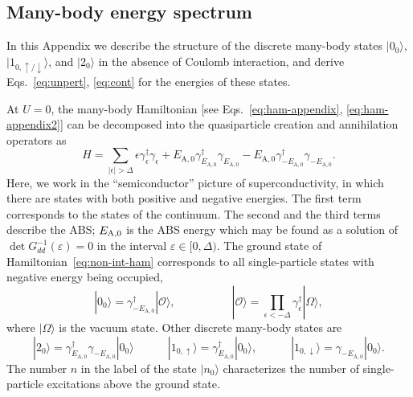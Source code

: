\documentclass[aps,reprint,longbibliography, prb]{revtex4-2}
\begin{document}
\subsection{Many-body energy spectrum \label{app:mb_spectrum}}
In this Appendix we describe the structure of the discrete many-body states $|0_0\rangle$, $|1_{0,\uparrow/\downarrow}\rangle$, and $|2_{0}\rangle$ in the absence of Coulomb interaction, and derive Eqs.~\eqref{eq:unpert}, \eqref{eq:cont} for the energies of these states. 

At $U = 0$, the many-body Hamiltonian [see Eqs.~\eqref{eq:ham-appendix}, \eqref{eq:ham-appendix2}] can be decomposed into the quasiparticle creation and annihilation operators as
\begin{equation}
\label{eq:non-int-ham}
H = \sum_{|\epsilon|>\Delta} \epsilon \gamma_\epsilon^\dagger \gamma_\epsilon + E_\mathrm{A,0} \gamma_{E_\mathrm{A,0}}^\dagger\gamma_{E_\mathrm{A,0}} - E_\mathrm{A,0} \gamma_{-E_\mathrm{A,0}}^\dagger\gamma_{-E_\mathrm{A,0}}.
\end{equation}
Here, we work in the ``semiconductor'' picture of superconductivity, in which there are states with both positive and negative energies. The first term corresponds to the states of the continuum. The second and the third terms describe the ABS; $E_{\rm A,0}$ is the ABS energy which may be found as a solution of $\det G^{-1}_{dd}(\varepsilon) = 0$ in the interval $\varepsilon \in [0, \Delta)$. The ground state of Hamiltonian~\eqref{eq:non-int-ham} corresponds to all single-particle states with negative energy being occupied,
\begin{equation}
    \label{eq:non-int-gs}
    |0_0\rangle = \gamma^\dagger_{-E_\mathrm{A,0}} |\mathcal{O}\rangle,\quad\quad\quad\quad\quad|\mathcal{O}\rangle = \prod_{\epsilon<-\Delta} \gamma_\epsilon^\dagger|\Omega\rangle,
\end{equation}
where $|\Omega\rangle$ is the vacuum state. Other discrete many-body states are
\begin{equation}
    \label{eq:app-states}
    |2_0\rangle = \gamma^\dagger_{E_\mathrm{A,0}}\gamma_{-E_\mathrm{A,0}}|0_0\rangle \quad\quad\quad|1_{0,\uparrow}\rangle = \gamma^\dagger_{E_\mathrm{A,0}} |0_0\rangle,\quad\quad\quad |1_{0,\downarrow}\rangle = \gamma_{-E_\mathrm{A,0}} |0_0\rangle.
\end{equation}
The number $n$ in the label of the state $|n_0\rangle$ characterizes the number of single-particle excitations above the ground state.
\end{document}
